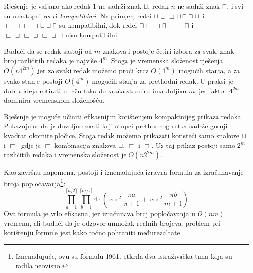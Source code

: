 Rješenje je valjano ako redak $1$ ne sadrži
znak $\sqcup$,
redak $n$ ne sadrži znak $\sqcap$,
i svi su uzastopni redci \emph{kompatibilni}.
Na primjer, redci
$\sqcup \sqsubset \sqsupset \sqcup \sqcap \sqcap \sqcup$ i
$\sqsubset \sqsupset \sqsubset \sqsupset \sqcup \sqcup \sqcap$ 
su kompatibilni, dok redci
$\sqcap \sqsubset \sqsupset \sqcap \sqsubset \sqsupset \sqcap$ i
$\sqsubset \sqsupset \sqsubset \sqsupset \sqsubset \sqsupset \sqcup$
nisu kompatibilni.

Budući da se redak sastoji od $m$ znakova i postoje
četiri izbora za svaki znak, broj različitih
redaka je najviše $4^m$.
Stoga je vremenska složenost rješenja
$O(n 4^{2m})$ jer za svaki redak možemo proći kroz
$O(4^m)$ mogućih stanja,
a za svako stanje postoji $O(4^m)$
mogućih stanja za prethodni redak.
U praksi je dobra ideja rotirati mrežu
tako da kraća stranica ima duljinu $m$,
jer faktor $4^{2m}$ dominira vremenskom složenošću.

Rješenje je moguće učiniti efikasnijim
korištenjem kompaktnijeg prikaza redaka.
Pokazuje se da je dovoljno znati koji
stupci prethodnog retka sadrže gornji kvadrat
okomite pločice.
Stoga redak možemo prikazati koristeći samo znakove
$\sqcap$ i $\Box$, gdje je $\Box$ kombinacija
znakova
$\sqcup$, $\sqsubset$ i $\sqsupset$.
Uz taj prikaz postoji samo
$2^m$ različitih redaka i vremenska složenost je
$O(n 2^{2m})$.

Kao završnu napomenu, postoji i iznenađujuća izravna formula
za izračunavanje broja popločavanja\footnote{Iznenađujuće,
ovu su formulu 1961. otkrila dva istraživačka tima \cite{kas61,tem61}
koja su radila neovisno.}:
\[ \prod_{a=1}^{\lceil n/2 \rceil} \prod_{b=1}^{\lceil m/2 \rceil} 4 \cdot (\cos^2 \frac{\pi a}{n + 1} + \cos^2 \frac{\pi b}{m+1})\]
Ova formula je vrlo efikasna, jer izračunava
broj popločavanja u $O(nm)$ vremenu,
ali budući da je odgovor umnožak realnih brojeva,
problem pri korištenju formule jest
kako točno pohraniti međurezultate.


